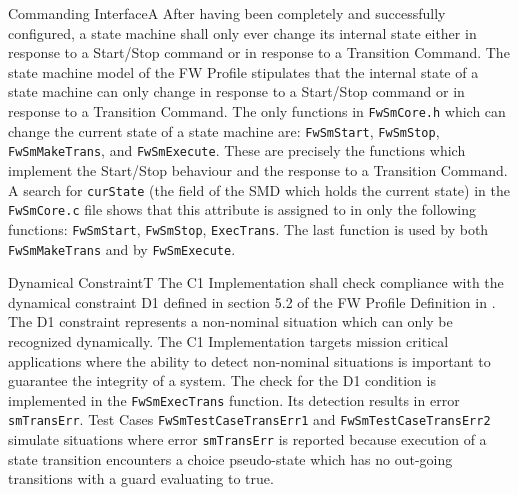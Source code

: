 \documentclass[requirements]{../fwprofile}
\begin{document}
\begin{fw_req}{Commanding Interface}{A}
{After having been completely and successfully configured, 
a state machine shall only ever change its internal state either in response to a 
Start/Stop command or in response to a Transition Command.}
{The state machine model of the FW Profile stipulates that the internal state of a state machine 
can only change in response to a Start/Stop command or in response to a Transition Command.}
{The only functions in \texttt{FwSmCore.h} which can 
change the current state of a state machine are: \texttt{FwSmStart}, \texttt{FwSmStop},
\texttt{FwSmMakeTrans}, and \texttt{FwSmExecute}. These are precisely 
the functions which implement the Start/Stop behaviour and the response to a 
Transition Command.} 
{A search for \texttt{curState} (the field of the SMD which holds 
the current state) in the \texttt{FwSmCore.c} 
file shows that this attribute is assigned to in only the following 
functions: \texttt{FwSmStart}, \texttt{FwSmStop}, \texttt{ExecTrans}. 
The last function is used by both \texttt{FwSmMakeTrans} and by \texttt{FwSmExecute}.}
\end{fw_req}

\begin{fw_req}{Dynamical Constraint}{T}
{The C1 Implementation shall check compliance with the dynamical 
constraint D1 defined in section 5.2 of the FW Profile 
Definition in \cite{ref:fwprofile}.}
{The D1 constraint represents a non-nominal situation which can
only be recognized dynamically. 
The C1 Implementation targets mission critical applications where the ability to 
detect non-nominal situations is important to guarantee the integrity of a system.}
{The check for the D1 condition is implemented in 
the \texttt{FwSmExecTrans} function. 
Its detection results in error \texttt{smTransErr}.} 
{Test Cases \texttt{FwSmTestCaseTransErr1} and
\texttt{FwSmTestCaseTransErr2} simulate situations where error \texttt{smTransErr} 
is reported because execution of a state transition encounters a choice pseudo-state
which has no out-going transitions with a guard evaluating to true.}
\end{fw_req}
\end{document}
